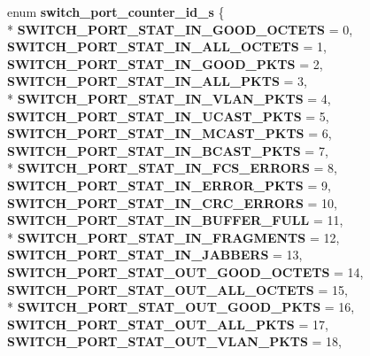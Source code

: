\begin{DoxyCompactItemize}
\item 
\hypertarget{group__Port_ga04c93b3ef80f48ad8f397afc2ca9efcc}{enum {\bfseries switch\+\_\+port\+\_\+counter\+\_\+id\+\_\+s} \{ \\*
{\bfseries S\+W\+I\+T\+C\+H\+\_\+\+P\+O\+R\+T\+\_\+\+S\+T\+A\+T\+\_\+\+I\+N\+\_\+\+G\+O\+O\+D\+\_\+\+O\+C\+T\+E\+T\+S} = 0, 
{\bfseries S\+W\+I\+T\+C\+H\+\_\+\+P\+O\+R\+T\+\_\+\+S\+T\+A\+T\+\_\+\+I\+N\+\_\+\+A\+L\+L\+\_\+\+O\+C\+T\+E\+T\+S} = 1, 
{\bfseries S\+W\+I\+T\+C\+H\+\_\+\+P\+O\+R\+T\+\_\+\+S\+T\+A\+T\+\_\+\+I\+N\+\_\+\+G\+O\+O\+D\+\_\+\+P\+K\+T\+S} = 2, 
{\bfseries S\+W\+I\+T\+C\+H\+\_\+\+P\+O\+R\+T\+\_\+\+S\+T\+A\+T\+\_\+\+I\+N\+\_\+\+A\+L\+L\+\_\+\+P\+K\+T\+S} = 3, 
\\*
{\bfseries S\+W\+I\+T\+C\+H\+\_\+\+P\+O\+R\+T\+\_\+\+S\+T\+A\+T\+\_\+\+I\+N\+\_\+\+V\+L\+A\+N\+\_\+\+P\+K\+T\+S} = 4, 
{\bfseries S\+W\+I\+T\+C\+H\+\_\+\+P\+O\+R\+T\+\_\+\+S\+T\+A\+T\+\_\+\+I\+N\+\_\+\+U\+C\+A\+S\+T\+\_\+\+P\+K\+T\+S} = 5, 
{\bfseries S\+W\+I\+T\+C\+H\+\_\+\+P\+O\+R\+T\+\_\+\+S\+T\+A\+T\+\_\+\+I\+N\+\_\+\+M\+C\+A\+S\+T\+\_\+\+P\+K\+T\+S} = 6, 
{\bfseries S\+W\+I\+T\+C\+H\+\_\+\+P\+O\+R\+T\+\_\+\+S\+T\+A\+T\+\_\+\+I\+N\+\_\+\+B\+C\+A\+S\+T\+\_\+\+P\+K\+T\+S} = 7, 
\\*
{\bfseries S\+W\+I\+T\+C\+H\+\_\+\+P\+O\+R\+T\+\_\+\+S\+T\+A\+T\+\_\+\+I\+N\+\_\+\+F\+C\+S\+\_\+\+E\+R\+R\+O\+R\+S} = 8, 
{\bfseries S\+W\+I\+T\+C\+H\+\_\+\+P\+O\+R\+T\+\_\+\+S\+T\+A\+T\+\_\+\+I\+N\+\_\+\+E\+R\+R\+O\+R\+\_\+\+P\+K\+T\+S} = 9, 
{\bfseries S\+W\+I\+T\+C\+H\+\_\+\+P\+O\+R\+T\+\_\+\+S\+T\+A\+T\+\_\+\+I\+N\+\_\+\+C\+R\+C\+\_\+\+E\+R\+R\+O\+R\+S} = 10, 
{\bfseries S\+W\+I\+T\+C\+H\+\_\+\+P\+O\+R\+T\+\_\+\+S\+T\+A\+T\+\_\+\+I\+N\+\_\+\+B\+U\+F\+F\+E\+R\+\_\+\+F\+U\+L\+L} = 11, 
\\*
{\bfseries S\+W\+I\+T\+C\+H\+\_\+\+P\+O\+R\+T\+\_\+\+S\+T\+A\+T\+\_\+\+I\+N\+\_\+\+F\+R\+A\+G\+M\+E\+N\+T\+S} = 12, 
{\bfseries S\+W\+I\+T\+C\+H\+\_\+\+P\+O\+R\+T\+\_\+\+S\+T\+A\+T\+\_\+\+I\+N\+\_\+\+J\+A\+B\+B\+E\+R\+S} = 13, 
{\bfseries S\+W\+I\+T\+C\+H\+\_\+\+P\+O\+R\+T\+\_\+\+S\+T\+A\+T\+\_\+\+O\+U\+T\+\_\+\+G\+O\+O\+D\+\_\+\+O\+C\+T\+E\+T\+S} = 14, 
{\bfseries S\+W\+I\+T\+C\+H\+\_\+\+P\+O\+R\+T\+\_\+\+S\+T\+A\+T\+\_\+\+O\+U\+T\+\_\+\+A\+L\+L\+\_\+\+O\+C\+T\+E\+T\+S} = 15, 
\\*
{\bfseries S\+W\+I\+T\+C\+H\+\_\+\+P\+O\+R\+T\+\_\+\+S\+T\+A\+T\+\_\+\+O\+U\+T\+\_\+\+G\+O\+O\+D\+\_\+\+P\+K\+T\+S} = 16, 
{\bfseries S\+W\+I\+T\+C\+H\+\_\+\+P\+O\+R\+T\+\_\+\+S\+T\+A\+T\+\_\+\+O\+U\+T\+\_\+\+A\+L\+L\+\_\+\+P\+K\+T\+S} = 17, 
{\bfseries S\+W\+I\+T\+C\+H\+\_\+\+P\+O\+R\+T\+\_\+\+S\+T\+A\+T\+\_\+\+O\+U\+T\+\_\+\+V\+L\+A\+N\+\_\+\+P\+K\+T\+S} = 18, 
}
\end{DoxyCompactItemize}
